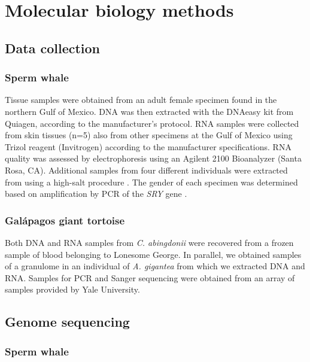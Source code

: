 \section{Molecular biology methods} \label{s_matmet_molecular}

\subsection{Data collection} \label{ss_matmet_molecular_data_colection}

\subsubsection*{Sperm whale} 

Tissue samples were obtained from an adult female specimen found in the northern Gulf of Mexico.
DNA was then extracted with the DNAeasy kit from Quiagen, according to the manufacturer's protocol. 
RNA samples were collected from skin tissues (n=5) also from other specimens at the Gulf of Mexico using Trizol reagent (Invitrogen) according to the manufacturer specifications.
RNA quality was assessed by electrophoresis using an Agilent 2100 Bioanalyzer (Santa Rosa, CA).
Additional samples from four different individuals were extracted from  using a high-salt procedure \cite{Godard2003}.
The gender of each specimen was determined based on amplification by PCR of the \textit{SRY} gene \cite{Richard1994}.

\subsubsection*{Gal\'{a}pagos giant tortoise}

Both DNA and RNA samples from \textit{C. abingdonii} were recovered from a frozen sample of blood belonging to Lonesome George.
In parallel, we obtained samples of a granulome in an individual of \textit{A. gigantea} from which we extracted DNA and RNA. %
Samples for PCR and Sanger sequencing were obtained from an array of samples provided by Yale University.

\subsection{Genome sequencing} \label{ss_matmet_molecular_genome_sequencing}

\subsubsection*{Sperm whale}

